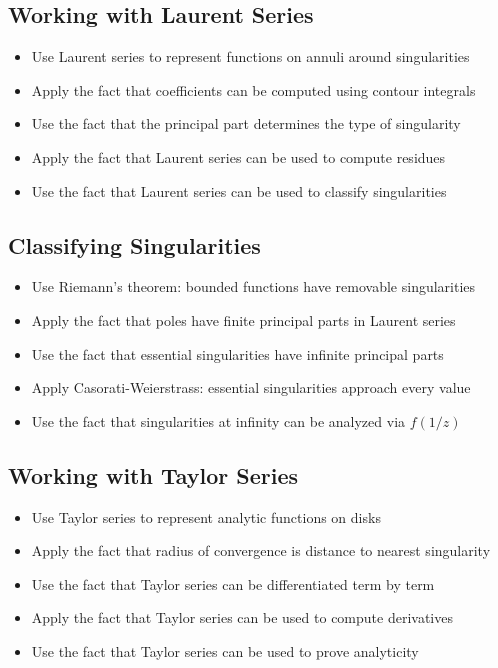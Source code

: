 \subsection*{Working with Laurent Series}
\begin{itemize}
\item Use Laurent series to represent functions on annuli around singularities
\item Apply the fact that coefficients can be computed using contour integrals
\item Use the fact that the principal part determines the type of singularity
\item Apply the fact that Laurent series can be used to compute residues
\item Use the fact that Laurent series can be used to classify singularities
\end{itemize}

\subsection*{Classifying Singularities}
\begin{itemize}
\item Use Riemann's theorem: bounded functions have removable singularities
\item Apply the fact that poles have finite principal parts in Laurent series
\item Use the fact that essential singularities have infinite principal parts
\item Apply Casorati-Weierstrass: essential singularities approach every value
\item Use the fact that singularities at infinity can be analyzed via $f(1/z)$
\end{itemize}

\subsection*{Working with Taylor Series}
\begin{itemize}
\item Use Taylor series to represent analytic functions on disks
\item Apply the fact that radius of convergence is distance to nearest singularity
\item Use the fact that Taylor series can be differentiated term by term
\item Apply the fact that Taylor series can be used to compute derivatives
\item Use the fact that Taylor series can be used to prove analyticity
\end{itemize}

